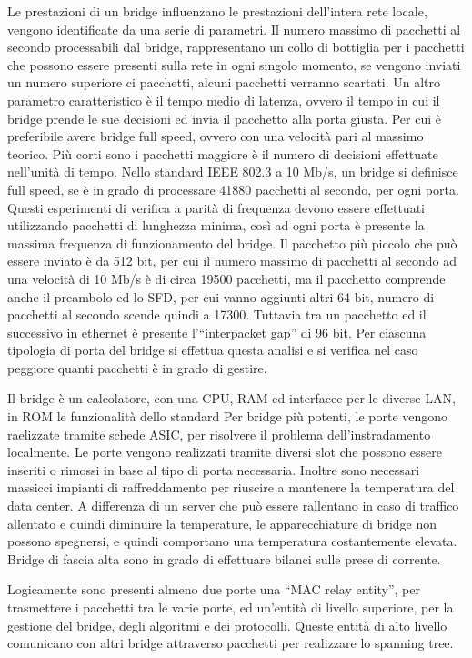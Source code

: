 \documentclass{article}
\numberwithin{equation}{subsection}
\begin{document}
Le prestazioni di un bridge influenzano le prestazioni dell'intera rete locale, vengono identificate da una serie di parametri. Il numero massimo di pacchetti al 
secondo processabili dal bridge, rappresentano un collo di bottiglia per i pacchetti che possono essere presenti sulla rete in ogni singolo momento, se vengono 
inviati un numero superiore ci pacchetti, alcuni pacchetti verranno scartati. Un altro parametro caratteristico è il tempo medio di latenza, ovvero il tempo in cui il 
bridge prende le sue decisioni ed invia il pacchetto alla porta giusta. 
Per cui è preferibile avere bridge full speed, ovvero con una velocità pari al massimo teorico. Più corti sono i pacchetti maggiore è il numero di decisioni 
effettuate nell'unità di tempo. Nello standard IEEE 802.3 a 10 Mb/s, un bridge si definisce full speed, se è in grado di processare 41880 pacchetti al secondo, 
per ogni porta. Questi esperimenti di verifica a parità di frequenza devono essere effettuati utilizzando pacchetti di lunghezza minima, così ad ogni porta è presente 
la massima frequenza di funzionamento del bridge. 
Il pacchetto più piccolo che può essere inviato è da 512 bit, per cui il numero massimo di pacchetti al secondo ad una 
velocità di 10 Mb/s è di circa 19500 pacchetti, ma il pacchetto comprende anche il preambolo ed lo SFD, per cui vanno aggiunti altri 64 bit, 
numero di pacchetti al secondo scende quindi a 17300. 
Tuttavia tra un pacchetto ed il successivo in ethernet è presente l'``interpacket gap'' di 96 bit. 
Per ciascuna tipologia di porta del bridge si effettua questa analisi e si verifica nel caso peggiore quanti pacchetti è in grado di gestire. 


Il bridge è un calcolatore, con una CPU, RAM ed interfacce per le diverse LAN, in ROM le funzionalità dello standard %
Per bridge più potenti, le  porte vengono raelizzate tramite schede ASIC, per risolvere il problema dell'instradamento localmente. Le porte vengono realizzati tramite 
diversi slot che possono essere inseriti o rimossi in base al tipo di porta necessaria. Inoltre sono necessari massicci impianti di raffreddamento per riuscire a 
mantenere la temperatura del data center. A differenza di un server che può essere rallentano in caso di traffico allentato e quindi diminuire la temperature, le apparecchiature di bridge non possono 
spegnersi, e quindi comportano una temperatura costantemente elevata. Bridge di fascia alta sono in grado di effettuare bilanci sulle prese di corrente. 

Logicamente sono presenti almeno due porte una ``MAC relay entity'', per trasmettere i pacchetti tra le varie porte, ed un'entità di livello superiore, per la gestione 
del bridge, degli algoritmi e dei protocolli. Queste entità di alto livello comunicano con altri bridge attraverso pacchetti per realizzare lo spanning tree. 
\end{document}
